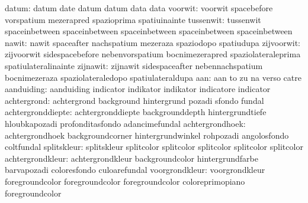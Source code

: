                     datum: datum                     date
                           datum                     datum
                           data                      data
                  voorwit: voorwit                   spacebefore
                           vorspatium                mezerapred
                           spazioprima               spatiuinainte
                tussenwit: tussenwit                 spaceinbetween
                           spaceinbetween            spaceinbetween
                           spaceinbetween            spaceinbetween
                    nawit: nawit                     spaceafter
                           nachspatium               mezeraza
                           spaziodopo                spatiudupa
               zijvoorwit: zijvoorwit                sidespacebefore
                           nebenvorspatium           bocnimezerapred
                           spaziolateraleprima       spatiulateralinainte
                 zijnawit: zijnawit                  sidespaceafter
                           nebennachspatium          bocnimezeraza
                           spaziolateraledopo        spatiulateraldupa
                      aan: aan                       to
                           zu                        na
                           verso                     catre
               aanduiding: aanduiding                indicator
                           indikator                 indikator
                           indicatore                indicator
              achtergrond: achtergrond               background
                           hintergrund               pozadi
                           sfondo                    fundal
        achtergronddiepte: achtergronddiepte         backgrounddepth
                           hintergrundtiefe          hloubkapozadi
                           profonditasfondo          adancimefundal
          achtergrondhoek: achtergrondhoek           backgroundcorner
                           hintergrundwinkel         rohpozadi
                           angolosfondo              coltfundal
splitskleur: splitskleur splitcolor
             splitcolor  splitcolor
             splitcolor  splitcolor
         achtergrondkleur: achtergrondkleur          backgroundcolor
                           hintergrundfarbe          barvapozadi
                           coloresfondo              culoarefundal
           voorgrondkleur: voorgrondkleur            foregroundcolor
                           foregroundcolor           foregroundcolor
                           coloreprimopiano          foregroundcolor
